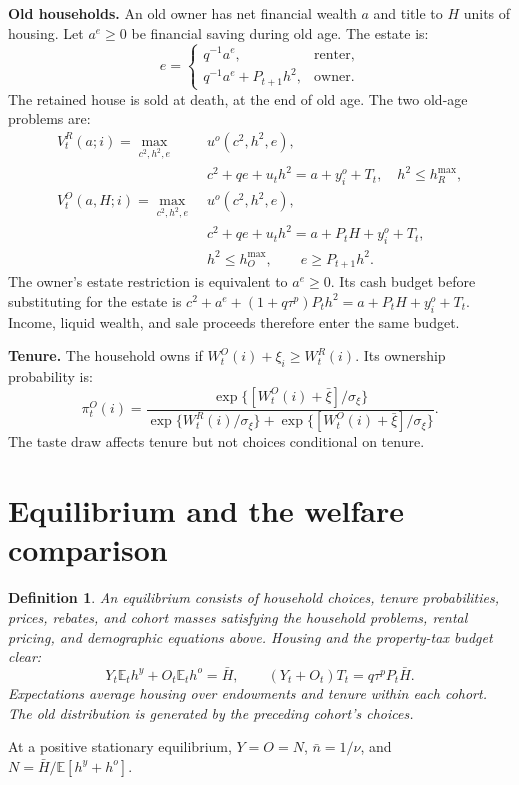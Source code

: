 \documentclass[11pt]{article}
\newtheorem{definition}{Definition}
\begin{document}
\textbf{Old households.} An old owner has net financial wealth $a$ and title
to $H$ units of housing. Let $a^e\ge0$ be financial saving during old age.
The estate is:
\begin{equation}
e=\begin{cases}
q^{-1}a^e,&\text{renter},\\
q^{-1}a^e+P_{t+1}h^2,&\text{owner}.
\end{cases}
\label{eq:new_estate}
\end{equation}
The retained house is sold at death, at the end of old age. The two old-age
problems are:
\begin{align}
V_t^R(a;i)=\max_{c^2,h^2,e}\;&u^o(c^2,h^2,e),\nonumber\\
&c^2+qe+u_th^2=a+y_i^o+T_t,\quad h^2\le h_R^{\max},
\label{eq:new_old_renter}\\
V_t^O(a,H;i)=\max_{c^2,h^2,e}\;&u^o(c^2,h^2,e),\nonumber\\
&c^2+qe+u_th^2=a+P_tH+y_i^o+T_t,\nonumber\\
&h^2\le h_O^{\max},\qquad e\ge P_{t+1}h^2.
\label{eq:new_old_owner}
\end{align}
The owner's estate restriction is equivalent to $a^e\ge0$. Its cash budget
before substituting for the estate is
$c^2+a^e+(1+q\tau^p)P_th^2=a+P_tH+y_i^o+T_t$.
Income, liquid wealth, and sale proceeds therefore enter the same budget.

\textbf{Tenure.} The household owns if $W_t^O(i)+\xi_i\ge W_t^R(i)$.
Its ownership probability is:
\begin{equation}
\pi_t^O(i)=
\frac{\exp\{[W_t^O(i)+\bar\xi]/\sigma_\xi\}}
{\exp\{W_t^R(i)/\sigma_\xi\}+\exp\{[W_t^O(i)+\bar\xi]/\sigma_\xi\}}.
\label{eq:new_tenure}
\end{equation}
The taste draw affects tenure but not choices conditional on tenure.

\section{Equilibrium and the welfare comparison}

\begin{definition}
An equilibrium consists of household choices, tenure probabilities, prices,
rebates, and cohort masses satisfying the household problems, rental pricing,
and demographic equations above. Housing and the property-tax budget clear:
\begin{equation}
Y_t\mathbb E_t h^y+O_t\mathbb E_t h^o=\bar H,
\qquad (Y_t+O_t)T_t=q\tau^pP_t\bar H.
\label{eq:clearing}
\end{equation}
Expectations average housing over endowments and tenure within each cohort.
The old distribution is generated by the preceding cohort's choices.
\end{definition}
At a positive stationary equilibrium, $Y=O=N$, $\bar n=1/\nu$, and
$N=\bar H/\mathbb E[h^y+h^o]$.
\end{document}
